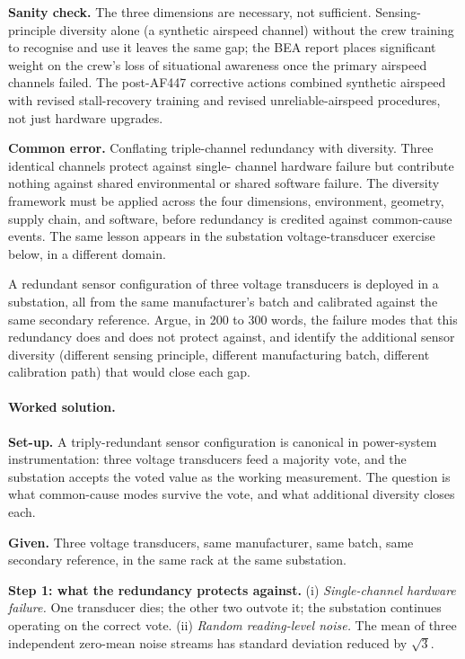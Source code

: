 \textbf{Sanity check.} The three dimensions are necessary, not
sufficient. Sensing-principle diversity alone (a synthetic
airspeed channel) without the crew training to recognise and use
it leaves the same gap; the BEA report places significant weight
on the crew's loss of situational awareness once the primary
airspeed channels failed. The post-AF447 corrective actions
combined synthetic airspeed with revised stall-recovery training
and revised unreliable-airspeed procedures, not just hardware
upgrades.

\textbf{Common error.} Conflating triple-channel redundancy with
diversity. Three identical channels protect against single-
channel hardware failure but contribute nothing against shared
environmental or shared software failure. The diversity framework
must be applied across the four dimensions, environment, geometry,
supply chain, and software, before redundancy is credited against
common-cause events. The same lesson appears in the substation
voltage-transducer exercise below, in a different domain.

\begin{exercise}
A redundant sensor configuration of three voltage transducers is
deployed in a substation, all from the same manufacturer's batch
and calibrated against the same secondary reference. Argue, in
200 to 300 words, the failure modes that this redundancy does and
does not protect against, and identify the additional sensor
diversity (different sensing principle, different manufacturing
batch, different calibration path) that would close each gap.
\end{exercise}

\paragraph{Worked solution.}
\textbf{Set-up.} A triply-redundant sensor configuration is
canonical in power-system instrumentation: three voltage
transducers feed a majority vote, and the substation accepts the
voted value as the working measurement. The question is what
common-cause modes survive the vote, and what additional
diversity closes each.

\textbf{Given.} Three voltage transducers, same manufacturer,
same batch, same secondary reference, in the same rack at the same
substation.

\textbf{Step 1: what the redundancy protects against.}
(i) \emph{Single-channel hardware failure.} One transducer dies;
the other two outvote it; the substation continues operating on
the correct vote. (ii) \emph{Random reading-level noise.} The
mean of three independent zero-mean noise streams has standard
deviation reduced by $\sqrt{3}$.

